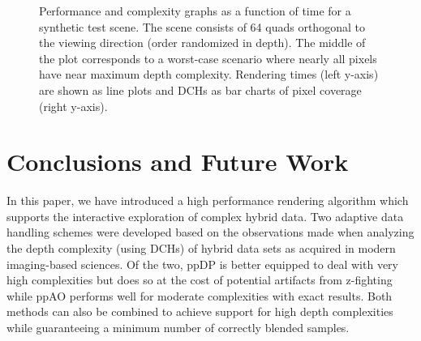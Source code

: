 \documentclass{egpubl}
\newcommand{\todo}[1]{{\color{red}\emph{(#1)}}}
\newcommand{\dch}{DCH}
\newcommand{\stencil}{ppAO}
\newcommand{\dloop}{ppDP}
\begin{document}
\begin{figure}[t]
\begin{minipage}{1.0\linewidth}
  \end{minipage}
  \caption{\label{fig:viewdep-quad}%
    Performance and complexity graphs as a function of time for a synthetic test scene. 
    The scene consists of 64 quads orthogonal to the viewing direction (order randomized in depth). 
    The middle of the plot corresponds to a worst-case scenario where nearly all pixels have near maximum depth complexity. 
    Rendering times (left y-axis) are shown as line plots and \dch{}s as bar charts of pixel coverage (right y-axis). 
  }
\end{figure}


\section{Conclusions and Future Work}
\label{sec:conclusion}

%

In this paper, we have introduced a high performance rendering algorithm which supports the interactive exploration of complex hybrid data. 
Two adaptive data handling schemes were developed based on the observations made when analyzing the depth complexity (using \dch{}s) of hybrid data sets as acquired in modern imaging-based sciences. 
Of the two, \dloop{} is better equipped to deal with very high complexities but does so at the cost of potential artifacts from z-fighting while \stencil{} performs well for moderate complexities with exact results. 
Both methods can also be combined to achieve support for high depth complexities while guaranteeing a minimum number of correctly blended samples. 
\end{document}
